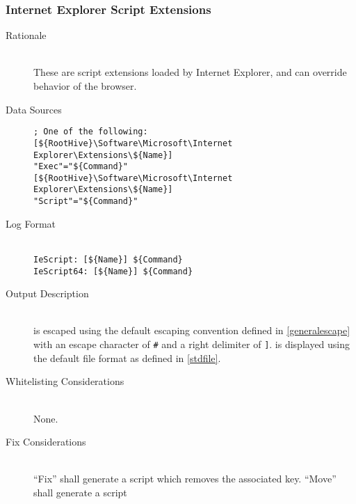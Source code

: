 \subsubsection{Internet Explorer Script Extensions}
\begin{description}
\item[Rationale] \hfill \\
These are script extensions loaded by Internet Explorer, and can override
behavior of the browser.
\item[Data Sources] \hfill
\begin{verbatim}
; One of the following:
[${RootHive}\Software\Microsoft\Internet Explorer\Extensions\${Name}]
"Exec"="${Command}"
[${RootHive}\Software\Microsoft\Internet Explorer\Extensions\${Name}]
"Script"="${Command}"
\end{verbatim}
\item[Log Format] \hfill \\
\verb|IeScript: [${Name}] ${Command}| \\
\verb|IeScript64: [${Name}] ${Command}|
\item[Output Description] \hfill \\
 is escaped using the default escaping convention defined in
\ref{generalescape} with an escape character of \verb|#| and a right delimiter
of \verb|]|.  is displayed using the default file format as defined
in \ref{stdfile}.
\item[Whitelisting Considerations] \hfill \\
None.
\item[Fix Considerations] \hfill \\
``Fix'' shall generate a script which removes the associated key. ``Move'' shall
generate a script
\end{description}

